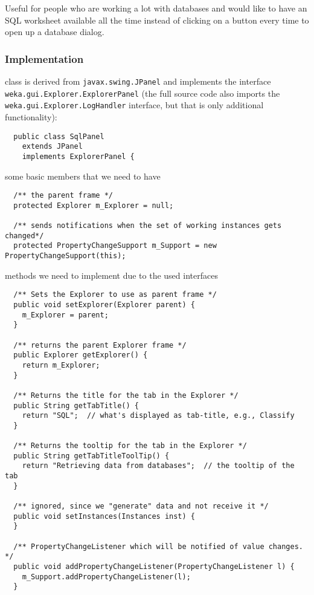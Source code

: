 Useful for people who are working a lot with databases and would like to have an
SQL worksheet available all the time instead of clicking on a button every time
to open up a database dialog.

\subsubsection*{Implementation}
\begin{tight_itemize}
  \item class is derived from \texttt{javax.swing.JPanel} and implements the
interface \texttt{weka.gui.Explorer.ExplorerPanel} (the full source code also
imports the \texttt{weka.gui.Explorer.LogHandler} interface, but that is only
additional functionality):
  \begin{verbatim}
  public class SqlPanel
    extends JPanel
    implements ExplorerPanel {
  \end{verbatim}

  \item some basic members that we need to have
  \begin{verbatim}
  /** the parent frame */
  protected Explorer m_Explorer = null;

  /** sends notifications when the set of working instances gets changed*/
  protected PropertyChangeSupport m_Support = new PropertyChangeSupport(this);
  \end{verbatim}

  \item methods we need to implement due to the used interfaces
  \begin{verbatim}
  /** Sets the Explorer to use as parent frame */
  public void setExplorer(Explorer parent) {
    m_Explorer = parent;
  }

  /** returns the parent Explorer frame */
  public Explorer getExplorer() {
    return m_Explorer;
  }

  /** Returns the title for the tab in the Explorer */
  public String getTabTitle() {
    return "SQL";  // what's displayed as tab-title, e.g., Classify
  }

  /** Returns the tooltip for the tab in the Explorer */
  public String getTabTitleToolTip() {
    return "Retrieving data from databases";  // the tooltip of the tab
  }

  /** ignored, since we "generate" data and not receive it */
  public void setInstances(Instances inst) {
  }

  /** PropertyChangeListener which will be notified of value changes. */
  public void addPropertyChangeListener(PropertyChangeListener l) {
    m_Support.addPropertyChangeListener(l);
  }


\end{verbatim}
\end{tight_itemize}
